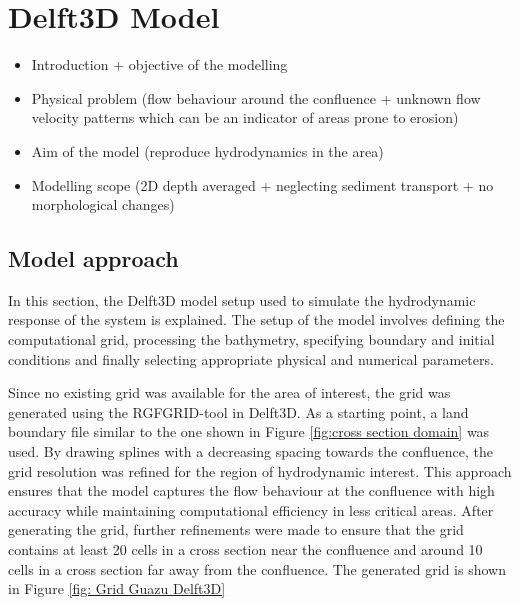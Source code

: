 \chapter{Delft3D Model}
\label{chap:Delft3DModel}

\begin{itemize}
    \item Introduction + objective of the modelling
    \item Physical problem (flow behaviour around the confluence + unknown flow velocity patterns which can be an indicator of areas prone to erosion)
    \item Aim of the model (reproduce hydrodynamics in the area)
    \item Modelling scope (2D depth averaged + neglecting sediment transport + no morphological changes)
\end{itemize}



\section{Model approach}
In this section, the Delft3D model setup used to simulate the hydrodynamic response of the system is explained. The setup of the model involves defining the computational grid, processing the bathymetry, specifying boundary and initial conditions and finally selecting appropriate physical and numerical parameters.

Since no existing grid was available for the area of interest, the grid was generated using the RGFGRID-tool in Delft3D. As a starting point, a land boundary file similar to the one shown in Figure \ref{fig:cross section domain} was used. By drawing splines with a decreasing spacing towards the confluence, the grid resolution was refined for the region of hydrodynamic interest. This approach ensures that the model captures the flow behaviour at the confluence with high accuracy while maintaining computational efficiency in less critical areas. After generating the grid, further refinements were made to ensure that the grid contains at least 20 cells in a cross section near the confluence and around 10 cells in a cross section far away from the confluence. The generated grid is shown in Figure \ref{fig: Grid Guazu Delft3D}

